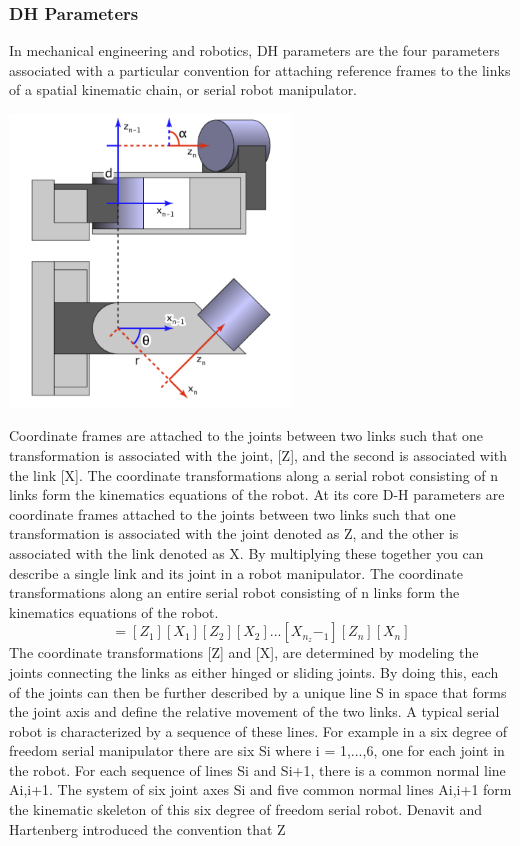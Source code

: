     \subsubsection{DH Parameters}
    In mechanical engineering and robotics, DH parameters are the four parameters associated with a particular convention for attaching reference frames to the links of a spatial kinematic chain, or serial robot manipulator.
    \begin{center}
    \includegraphics[width=75mm]{Dh.PNG}
    \end{center}
    Coordinate frames are attached to the joints between two links such that one transformation is associated with the joint, [Z], and the second is associated with the link [X]. The coordinate transformations along a serial robot consisting of n links form the kinematics equations of the robot. At its core D-H parameters are coordinate frames attached to the joints between two links such that one transformation is associated with the joint denoted as Z, and the other is associated with the link denoted as X. By multiplying these together you can describe a single link and its joint in a robot manipulator. The coordinate transformations along an entire serial robot consisting of n links form the kinematics equations of the robot.
    \begin{equation}
    [T] = [Z_1][X_1][Z_2][X_2]...[X_n_z-_1][Z_n][X_n]
    \end{equation}
    The coordinate transformations [Z] and [X], are determined by modeling the joints connecting the links as either hinged or sliding joints. By doing this, each of the joints can then be further described by a unique line S in space that forms the joint axis and define the relative movement of the two links. A typical serial robot is characterized by a sequence of these lines. For example in a six degree of freedom serial manipulator there are six Si where i = 1,...,6, one for each joint in the robot. For each sequence of lines Si and Si+1, there is a common normal line Ai,i+1. The system of six joint axes Si and five common normal lines Ai,i+1 form the kinematic skeleton of this six degree of freedom serial robot. Denavit and Hartenberg introduced the convention that Z 


